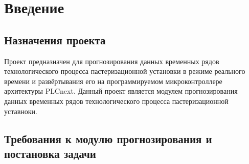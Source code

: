 \sectionbreak \section{ \standartTitleFont
  Введение
}

\subsection{ \standartTitleFont
  Назначения проекта
}

{\standartFont

  \par Проект предназначен для прогнозирования данных временных рядов технологического процесса пастеризационной установки в режиме реального времени и развёртывания его на программируемом микроконтроллере архитектуры PLCnext. Данный проект является модулем прогнозирования данных временных рядов технологического процесса пастеризационной уставноки.

  \par
}

\subsection{ \standartTitleFont
  Требования к модулю прогнозирования и постановка задачи
}

